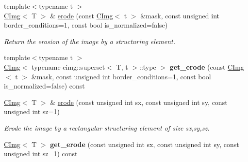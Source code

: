 \begin{DoxyCompactItemize}
\item 
\hypertarget{structcimg__library_1_1CImg_ad61f96b21a006f058e98b0643bcc36f8}{
{\footnotesize template$<$typename t $>$ }\\\hyperlink{structcimg__library_1_1CImg}{CImg}$<$ T $>$ \& \hyperlink{structcimg__library_1_1CImg_ad61f96b21a006f058e98b0643bcc36f8}{erode} (const \hyperlink{structcimg__library_1_1CImg}{CImg}$<$ t $>$ \&mask, const unsigned int border\_\-conditions=1, const bool is\_\-normalized=false)}
\label{structcimg__library_1_1CImg_ad61f96b21a006f058e98b0643bcc36f8}

\begin{DoxyCompactList}\small\item\em Return the erosion of the image by a structuring element. \item\end{DoxyCompactList}\item 
\hypertarget{structcimg__library_1_1CImg_a3976661afb2a89c0de05271d0589ad09}{
{\footnotesize template$<$typename t $>$ }\\\hyperlink{structcimg__library_1_1CImg}{CImg}$<$ typename cimg::superset$<$ T, t $>$::type $>$ {\bfseries get\_\-erode} (const \hyperlink{structcimg__library_1_1CImg}{CImg}$<$ t $>$ \&mask, const unsigned int border\_\-conditions=1, const bool is\_\-normalized=false) const }
\label{structcimg__library_1_1CImg_a3976661afb2a89c0de05271d0589ad09}

\item 
\hypertarget{structcimg__library_1_1CImg_ab58987f431d2de79d8b4253e0f4b9ff1}{
\hyperlink{structcimg__library_1_1CImg}{CImg}$<$ T $>$ \& \hyperlink{structcimg__library_1_1CImg_ab58987f431d2de79d8b4253e0f4b9ff1}{erode} (const unsigned int sx, const unsigned int sy, const unsigned int sz=1)}
\label{structcimg__library_1_1CImg_ab58987f431d2de79d8b4253e0f4b9ff1}

\begin{DoxyCompactList}\small\item\em Erode the image by a rectangular structuring element of size sx,sy,sz. \item\end{DoxyCompactList}\item 
\hypertarget{structcimg__library_1_1CImg_ad75ea7ef26e1c54eeaccdaec4f19bd73}{
\hyperlink{structcimg__library_1_1CImg}{CImg}$<$ T $>$ {\bfseries get\_\-erode} (const unsigned int sx, const unsigned int sy, const unsigned int sz=1) const }
\label{structcimg__library_1_1CImg_ad75ea7ef26e1c54eeaccdaec4f19bd73}


\end{DoxyCompactItemize}
